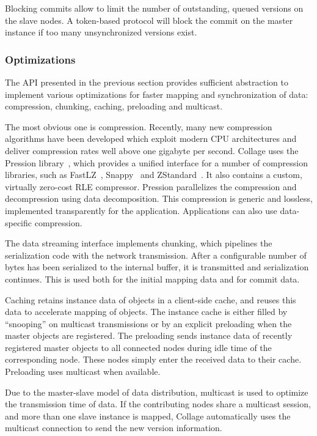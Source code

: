 Blocking commits allow to limit the number of outstanding, queued versions on
the slave nodes. A token-based protocol will block the commit on the master
instance if too many unsynchronized versions exist.

\subsubsection{Optimizations}

The API presented in the previous section provides sufficient abstraction to
implement various optimizations for faster mapping and synchronization of data:
compression, chunking, caching, preloading and multicast.

The most obvious one is compression. Recently, many new compression algorithms
have been developed which exploit modern CPU architectures and deliver
compression rates well above one gigabyte per second. \textsf{Collage} uses the
Pression library~\cite{pression}, which provides a unified interface for a
number of compression libraries, such as FastLZ~\cite{jesperfast},
Snappy~\cite{snappy} and ZStandard~\cite{zstd}. It also contains a custom,
virtually zero-cost RLE compressor. Pression parallelizes the compression and
decompression using data decomposition. This compression is generic and
lossless, implemented transparently for the application. Applications can also
use data-specific compression.

The data streaming interface implements chunking, which pipelines the
serialization code with the network transmission. After a configurable number of
bytes has been serialized to the internal buffer, it is transmitted and
serialization continues. This is used both for the initial mapping data and for
commit data.

Caching retains instance data of objects in a client-side cache, and reuses
this data to accelerate mapping of objects. The instance cache is either filled
by ``snooping'' on multicast transmissions or by an explicit preloading when
the master objects are registered. The preloading sends instance data of
recently registered master objects to all connected nodes during idle time of
the corresponding node. These nodes simply enter the received data to their
cache. Preloading uses multicast when available.

Due to the master-slave model of data distribution, multicast is used to
optimize the transmission time of data. If the contributing nodes share a
multicast session, and more than one slave instance is mapped, \textsf{Collage}
automatically uses the multicast connection to send the new version information.

